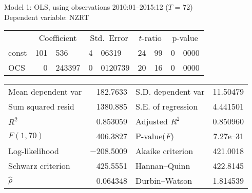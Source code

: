 \documentclass[11pt]{article}
\begin{document}
\thispagestyle{empty}

\begin{center}

Model 1: OLS, using observations 2010:01--2015:12 ($T$ = 72)\\
Dependent variable: NZRT\\

\vspace{1em}

\begin{tabular}{lr@{.}lr@{.}lr@{.}lr@{.}l}
  &
 \multicolumn{2}{c}{Coefficient} &
  \multicolumn{2}{c}{Std.\ Error} &
   \multicolumn{2}{c}{$t$-ratio} &
    \multicolumn{2}{c}{p-value} \\[1ex]
const &
  101&536 &
    4&06319 &
      24&99 &
        0&0000 \\
OCS &
  0&243397 &
    0&0120739 &
      20&16 &
        0&0000 \\
\end{tabular}

\vspace{1ex}
\begin{tabular}{lrlr}
Mean dependent var &  182.7633 & S.D. dependent var &  11.50479 \\
Sum squared resid &  1380.885 & S.E. of regression &  4.441501 \\
$R^2$ &  0.853059 & Adjusted $R^2$ &  0.850960 \\
$F(1, 70)$ &  406.3827 & P-value($F$) &  7.27\textrm{e--31} \\
Log-likelihood & $-$208.5009 & Akaike criterion &  421.0018 \\
Schwarz criterion &  425.5551 & Hannan--Quinn &  422.8145 \\
$\hat{\rho}$ &  0.064348 & Durbin--Watson &  1.814539 \\
\end{tabular}


\end{center}
\end{document}
